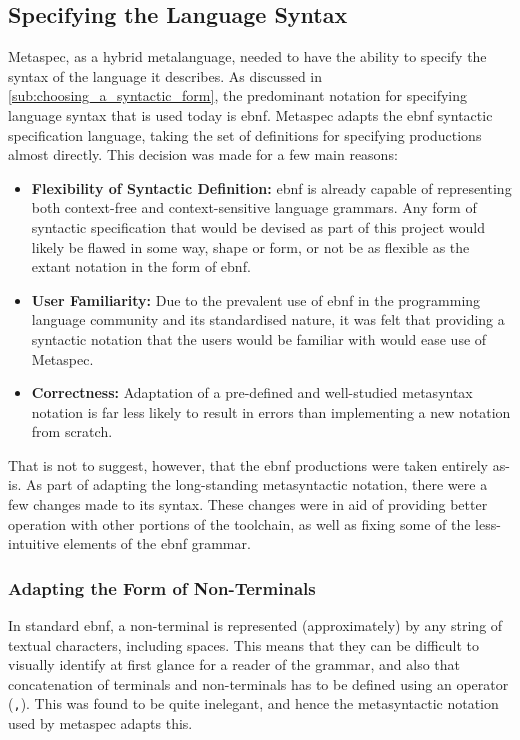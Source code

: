 

\subsection{Specifying the Language Syntax} %
\label{sub:specifying_the_language_syntax}
Metaspec, as a hybrid metalanguage, needed to have the ability to specify the syntax of the language it describes. 
As discussed in \autoref{sub:choosing_a_syntactic_form}, the predominant notation for specifying language syntax that is used today is \gls{ebnf}.
Metaspec adapts the \gls{ebnf} syntactic specification language, taking the set of definitions for specifying productions almost directly.
This decision was made for a few main reasons:
\begin{itemize}
    \item \textbf{Flexibility of Syntactic Definition:} \gls{ebnf} is already capable of representing both context-free and context-sensitive language grammars.
    Any form of syntactic specification that would be devised as part of this project would likely be flawed in some way, shape or form, or not be as flexible as the extant notation in the form of \gls{ebnf}. 
    \item \textbf{User Familiarity:} Due to the prevalent use of \gls{ebnf} in the programming language community and its standardised nature, it was felt that providing a syntactic notation that the users would be familiar with would ease use of Metaspec. 
    \item \textbf{Correctness:} Adaptation of a pre-defined and well-studied metasyntax notation is far less likely to result in errors than implementing a new notation from scratch.
\end{itemize}

That is not to suggest, however, that the \gls{ebnf} productions were taken entirely as-is. 
As part of adapting the long-standing metasyntactic notation, there were a few changes made to its syntax.
These changes were in aid of providing better operation with other portions of the toolchain, as well as fixing some of the less-intuitive elements of the \gls{ebnf} grammar. 

\subsubsection{Adapting the Form of Non-Terminals} %
\label{ssub:adapting_the_form_of_non_terminals}
In standard \gls{ebnf}, a non-terminal is represented (approximately) by any string of textual characters, including spaces. 
This means that they can be difficult to visually identify at first glance for a reader of the grammar, and also that concatenation of terminals and non-terminals has to be defined using an operator (\texttt{,}).
This was found to be quite inelegant, and hence the metasyntactic notation used by \gls{metaspec} adapts this. \\

